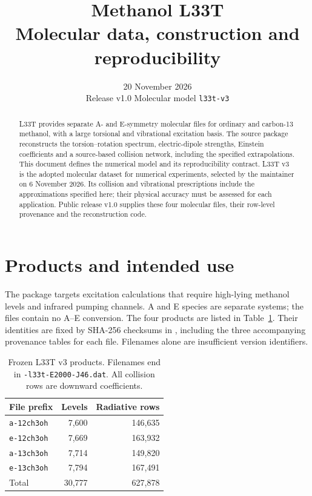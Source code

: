 \documentclass[11pt,a4paper]{article}
\title{Methanol L33T\\\large Molecular data, construction and reproducibility}
\date{20 November 2026\\\small Release v1.0 \quad Molecular model \texttt{l33t-v3}}
\begin{document}
\maketitle
\begin{abstract}
L33T provides separate A- and E-symmetry molecular files for ordinary and
carbon-13 methanol, with a large torsional and vibrational excitation basis.
The source package reconstructs the torsion--rotation spectrum, electric-dipole
strengths, Einstein coefficients and a source-based collision network, including
the specified extrapolations. This document defines the numerical model and its
reproducibility contract. L33T v3 is the adopted molecular dataset for numerical
experiments, selected by the maintainer on 6 November 2026. Its collision and
vibrational prescriptions include the approximations specified here; their
physical accuracy must be assessed for each application. Public release v1.0 supplies these four molecular files, their row-level
provenance and the reconstruction code.
\end{abstract}
\tableofcontents
\clearpage

\section{Products and intended use}
The package targets excitation calculations that require high-lying methanol
levels and infrared pumping channels. A and E species are separate systems;
the files contain no A--E conversion. The four products are listed in
Table~\ref{tab:products}. Their identities are fixed by SHA-256 checksums in
, including the three accompanying provenance
tables for each file. Filenames alone are insufficient version identifiers.

\begin{table}[ht]
\centering
\caption{Frozen L33T v3 products. Filenames end in
\texttt{-l33t-E2000-J46.dat}. All collision rows are downward coefficients.}
\label{tab:products}
\begin{tabular}{lrr}
\toprule File prefix & Levels & Radiative rows\\\midrule
\texttt{a-12ch3oh} & 7,600 & 146,635\\
\texttt{e-12ch3oh} & 7,669 & 163,932\\
\texttt{a-13ch3oh} & 7,714 & 149,820\\
\texttt{e-13ch3oh} & 7,794 & 167,491\\\midrule
Total & 30,777 & 627,878\\\bottomrule
\end{tabular}
\end{table}
\end{document}
